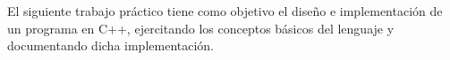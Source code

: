 	El siguiente trabajo práctico tiene como objetivo el diseño e implementación de un programa en C++, ejercitando los conceptos básicos del lenguaje y documentando dicha implementación.


